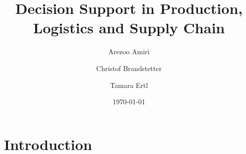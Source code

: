 \documentclass{article}
\title{Decision Support in Production, Logistics and Supply Chain}
\author{Arezoo Amiri \and Christof Brandstetter \and Tamara Ertl}
\date{\today}
\begin{document}
\maketitle

\section{Introduction}
\end{document}
